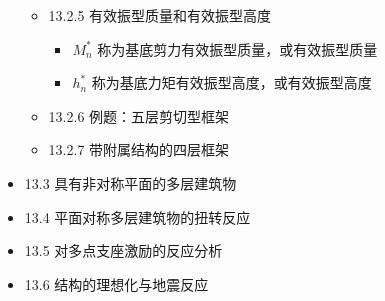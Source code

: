 \documentclass[11pt]{article}
\begin{document}
\begin{itemize}
\begin{itemize}
\begin{itemize}
\end{itemize}
\item 13.2.5 有效振型质量和有效振型高度
\label{sec:org3a03297}
\begin{itemize}
\item \(M^{*}_{n}\) 称为基底剪力有效振型质量，或有效振型质量
\item \(h^{*}_{n}\) 称为基底力矩有效振型高度，或有效振型高度
\end{itemize}
\item 13.2.6 例题：五层剪切型框架
\label{sec:org89492fb}
\item 13.2.7 带附属结构的四层框架
\label{sec:org23ef511}
\end{itemize}
\item 13.3 具有非对称平面的多层建筑物
\label{sec:orgf6cf087}
\item 13.4 平面对称多层建筑物的扭转反应
\label{sec:org082ea6c}
\item 13.5 对多点支座激励的反应分析
\label{sec:org6f96c4c}
\item 13.6 结构的理想化与地震反应
\label{sec:org8afa940}
\end{itemize}
\end{document}

